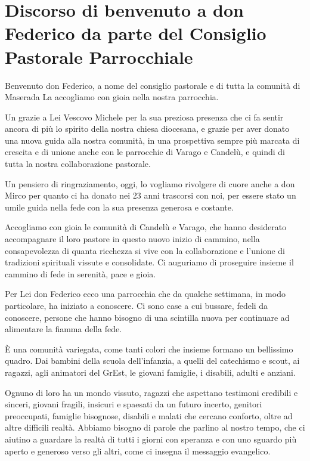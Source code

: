 \section{Discorso di benvenuto a don Federico da parte del Consiglio Pastorale Parrocchiale}

Benvenuto don Federico,
a nome del consiglio pastorale e di tutta la comunità di Maserada La accogliamo con gioia nella nostra parrocchia.

Un grazie a Lei Vescovo Michele per la sua preziosa presenza che ci fa sentir ancora di più lo spirito della nostra chiesa diocesana, e grazie per aver donato una nuova guida alla nostra comunità, in una prospettiva sempre più marcata di crescita e di unione anche con le parrocchie di Varago e Candelù, e quindi di tutta la nostra collaborazione pastorale.

Un pensiero di ringraziamento, oggi, lo vogliamo rivolgere di cuore anche a don Mirco per quanto ci ha donato nei 23 anni trascorsi con noi, per essere stato un umile guida nella fede con la sua presenza generosa e costante.

Accogliamo con gioia le comunità di Candelù e Varago, che hanno desiderato accompagnare il loro pastore in questo nuovo inizio di cammino, nella consapevolezza di quanta ricchezza si vive con la collaborazione e l'unione di tradizioni spirituali vissute e consolidate. Ci auguriamo di proseguire insieme il cammino di fede in serenità, pace e gioia.

Per Lei don Federico ecco una parrocchia che da qualche settimana, in modo particolare, ha iniziato a conoscere. Ci sono case a cui bussare, fedeli da conoscere, persone che hanno bisogno di una scintilla nuova per continuare ad alimentare la fiamma della fede.

È una comunità variegata, come tanti colori che insieme formano un bellissimo quadro. Dai bambini della scuola dell'infanzia, a quelli del catechismo e scout, ai ragazzi, agli animatori del GrEst, le giovani famiglie, i disabili, adulti e anziani.

Ognuno di loro ha un mondo vissuto, ragazzi che aspettano testimoni credibili e sinceri, giovani fragili, insicuri e spaesati da un futuro incerto, genitori preoccupati, famiglie bisognose, disabili e malati che cercano conforto, oltre ad altre difficili realtà. Abbiamo bisogno di parole che parlino al nostro tempo, che ci aiutino a guardare la realtà di tutti i giorni con speranza e con uno sguardo più aperto e generoso verso gli altri, come ci insegna il messaggio evangelico.

